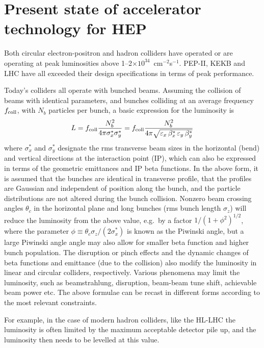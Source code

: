 \section{Present state of accelerator technology for HEP}

Both circular electron-positron and hadron colliders have operated or are operating at peak luminosities above 1--2$\times 10^{34}$~cm$^{-2}$s$^{-1}$. 
PEP-II, KEKB and LHC have all exceeded their design specifications in terms of peak performance. 

Today's colliders all operate with bunched beams.
Assuming the collision of beams with identical parameters,
and bunches colliding at an average frequency 
$f_{\rm coll}$, with $N_{b}$ particles per bunch, 
a basic expression for the luminosity is 
\begin{equation} \label{accel:eq:lum}
    L = f_{\rm coll} \frac{N_b^2 }{4\pi\sigma_x^{\ast} \sigma_y^{\ast}}
    =  f_{\rm coll} \frac{N_b^2}{4\pi \sqrt{\varepsilon_x\,\beta_x^*\,\varepsilon_y\,\beta_y^*}}
\end{equation}
where $\sigma_x^{\ast}$ and $\sigma_y^{\ast}$ designate the rms transverse beam 
sizes in the horizontal (bend) and vertical directions at the interaction point (IP), which can also be expressed in terms of the geometric emittances  and IP beta functions.     
In the above form, 
it is assumed that the bunches are identical in transverse profile,
that the profiles are Gaussian and independent of position along the bunch, and the particle
distributions are not altered during the 
bunch collision. 
Nonzero beam crossing angles $\theta_{c}$ in the horizontal plane and long bunches 
(rms bunch length $\sigma_{z}$) will reduce the luminosity from the above value, 
e.g.~by a factor $1/(1+\phi^{2})^{1/2}$, 
where the parameter
$ \phi \equiv \theta_{c} \sigma_{z}/(2 \sigma_{x}^{\ast})$ is known as the Piwinski angle,
but a large Piwinski angle angle may also allow for smaller beta function and higher bunch population. 
The disruption or pinch effects and the dynamic changes of beta functions and emittance (due to the collision) also modify the luminosity in linear and circular colliders, respectively. 
Various phenomena may limit the luminosity,
such as beamstrahlung, disruption, beam-beam tune shift, achievable beam power etc.
The above formulae can be recast in different forms according to the most relevant constraints.

For example, in the case of modern hadron colliders, like the HL-LHC the luminosity is often limited by the maximum acceptable detector pile up, and the luminosity then needs to be levelled at this value. 

